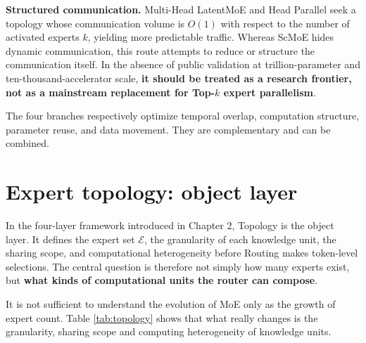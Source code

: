 \documentclass[10pt,a4paper,fontset=none]{ctexart}
\newcommand{\term}[1]{\textbf{#1}}
\begin{document}
\textbf{Structured communication.} Multi-Head LatentMoE and Head Parallel seek a topology whose communication volume is $O(1)$ with respect to the number of activated experts $k$, yielding more predictable traffic\cite{cui2026latentmoe}. Whereas ScMoE hides dynamic communication, this route attempts to reduce or structure the communication itself. In the absence of public validation at trillion-parameter and ten-thousand-accelerator scale, \term{it should be treated as a research frontier, not as a mainstream replacement for Top-$k$ expert parallelism}.

The four branches respectively optimize temporal overlap, computation structure, parameter reuse, and data movement. They are complementary and can be combined.

\section{Expert topology: object layer}

In the four-layer framework introduced in Chapter 2, Topology is the object layer. It defines the expert set $\mathcal{E}$, the granularity of each knowledge unit, the sharing scope, and computational heterogeneity before Routing makes token-level selections. The central question is therefore not simply how many experts exist, but \term{what kinds of computational units the router can compose}.

It is not sufficient to understand the evolution of MoE only as the growth of expert count. Table \ref{tab:topology} shows that what really changes is the granularity, sharing scope and computing heterogeneity of knowledge units.
\end{document}
